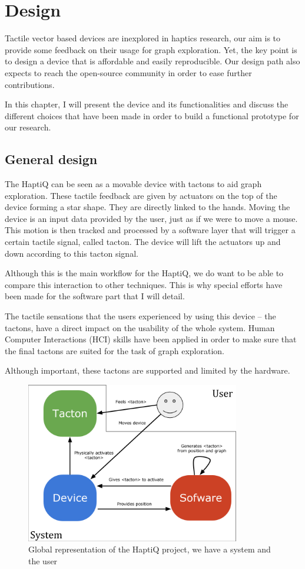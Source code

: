 \chapter{Design}

Tactile vector based devices are inexplored in haptics research, our aim is to provide some feedback on their usage for graph exploration. Yet, the key point is to design a device that is affordable and easily reproducible. Our design path also expects to reach the open-source community in order to ease further contributions.

In this chapter, I will present the device and its functionalities and discuss the different choices that have been made in order to build a functional prototype for our research.

\section{General design}\label{global-design}

The HaptiQ can be seen as a movable device with tactons to aid graph
exploration. These tactile feedback are given by actuators on the top of
the device forming a star shape. They are directly linked to the hands.
Moving the device is an input data provided by the user, just as if we
were to move a mouse. This motion is then tracked and processed by a
software layer that will trigger a certain tactile signal, called
tacton. The device will lift the actuators up and down according to this
tacton signal.

Although this is the main workflow for the HaptiQ, we do want to be able
to compare this interaction to other techniques. This is why special
efforts have been made for the software part that I will detail.

The tactile sensations that the users experienced by using this device -- the
tactons, have a direct impact on the usability of the whole system.
Human Computer Interactions (HCI) skills have been applied in order to
make sure that the final tactons are suited for the task of graph
exploration.

Although important, these tactons are supported and limited by the
hardware.

\begin{figure}[!ht]
  \centering
  \includegraphics[height=7cm]{figures/haptiq_global.png}
  \caption{Global representation of the HaptiQ project, we have a system and the user}
\end{figure}

